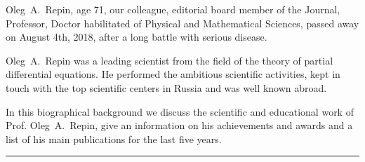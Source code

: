 \vskip2mm





\footnotesize



\smallskip






Oleg~A.~Repin, age 71, our colleague, editorial board member of the Journal, Professor, Doctor habilitated of Physical and Mathematical Sciences, passed away on August 4th, 2018, after a long battle with serious disease.



Oleg~A.~Repin was a leading scientist from the field of the theory of partial differential equations. He performed the ambitious scientific activities, kept in touch with the top scientific centers in Russia and was well known abroad.



In this biographical background we discuss the scientific and educational work of Prof. Oleg~A.~Repin, give an information on his achievements and awards and a list of his main publications for the last five years.





\bigskip



\par\noindent

\theonlineengdate \par\noindent

\rule{125mm}{.7pt}\\

















\renewcommand{\baselinestretch}{0.9}





\newpage



%



